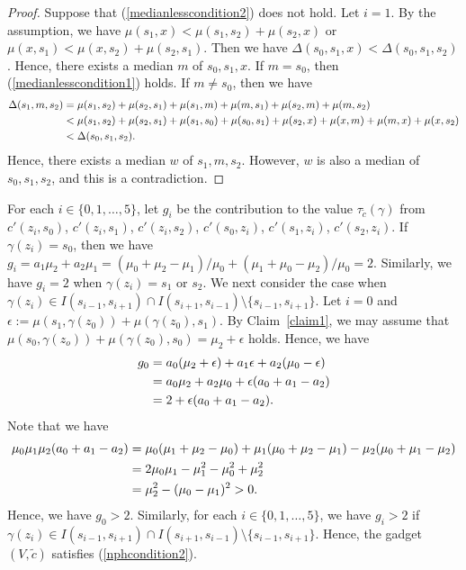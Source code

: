\documentclass[11pt]{article}
\theoremstyle{definition}
\begin{document}
\begin{proof}
Suppose that (\ref{medianlesscondition2}) does not hold. Let $i=1$. By the assumption, we have $\mu(s_1,x)<\mu(s_1,s_2)+\mu(s_2,x)$ or $\mu(x,s_1)<\mu(x,s_2)+\mu(s_2,s_1)$. Then we have $\Delta(s_0,s_1,x)<\Delta(s_0,s_1,s_2)$. Hence, there exists a median $m$ of $s_0,s_1,x$. If $m=s_0$, then (\ref{medianlesscondition1}) holds. If $m\neq s_0$, then we have
\begin{align}
    \Delta(s_1,m,s_2)&=\mu(s_1,s_2)+\mu(s_2,s_1)+\mu(s_1,m)+\mu(m,s_1)+\mu(s_2,m)+\mu(m,s_2)\notag
    \\&<\mu(s_1,s_2)+\mu(s_2,s_1)+\mu(s_1,s_0)+\mu(s_0,s_1)+\mu(s_2,x)+\mu(x,m)+\mu(m,x)+\mu(x,s_2)\notag\\
    &< \Delta(s_0,s_1,s_2).
\end{align}
Hence, there exists a median $w$ of $s_1,m,s_2$. However, $w$ is also a median of $s_0,s_1,s_2$, and this is a contradiction.
\end{proof}

For each $i\in \{0,1,\ldots,5\}$, let $g_i$ be the contribution to the value $\tau_{\tilde{c}}(\gamma)$ from $c'(z_i,s_0)$, $c'(z_i,s_1)$, $c'(z_i,s_2)$, $c'(s_0,z_i)$, $c'(s_1,z_i)$, $c'(s_2,z_i)$. If $\gamma(z_i)=s_0$, then we have $g_i=a_1\mu_2+a_2\mu_1=(\mu_0+\mu_2-\mu_1)/\mu_0+(\mu_1+\mu_0-\mu_2)/\mu_0=2$. Similarly, we have $g_i=2$ when $\gamma(z_i)=s_1$ or $s_2$. We next consider the case when $\gamma(z_i)\in I(s_{i-1},s_{i+1})\cap I(s_{i+1},s_{i-1})\setminus \{s_{i-1},s_{i+1}\}$. Let $i=0$ and $\epsilon:=\mu(s_1,\gamma(z_0))+\mu(\gamma(z_0),s_1)$. By Claim~\ref{claim1}, we may assume that $\mu(s_0,\gamma(z_o))+\mu(\gamma(z_0),s_0)=\mu_2+\epsilon$ holds. Hence, we have
\begin{align}
    g_0&=a_0(\mu_2+\epsilon)+a_1\epsilon+a_2(\mu_0-\epsilon)\notag\\&=a_0\mu_2+a_2\mu_0+\epsilon(a_0+a_1-a_2)\notag\\
    &=2+\epsilon(a_0+a_1-a_2).
\end{align}
Note that we have
\begin{align}
    \mu_0\mu_1\mu_2(a_0+a_1-a_2)&=\mu_0(\mu_1+\mu_2-\mu_0)+\mu_1(\mu_0+\mu_2-\mu_1)-\mu_2(\mu_0+\mu_1-\mu_2)\notag\\
    &=2\mu_0\mu_1-\mu_1^2-\mu_0^2+\mu_2^2\notag\\
    &=\mu_2^2-(\mu_0-\mu_1)^2>0.
\end{align}
Hence, we have $g_0>2$. Similarly, for each $i\in \{0,1,\ldots,5\}$, we have $g_i>2$ if $\gamma(z_i)\in I(s_{i-1},s_{i+1})\cap I(s_{i+1},s_{i-1})\setminus \{s_{i-1},s_{i+1}\}$. Hence, the gadget $(V,\tilde{c})$ satisfies (\ref{nphcondition2}). 
\end{document}
